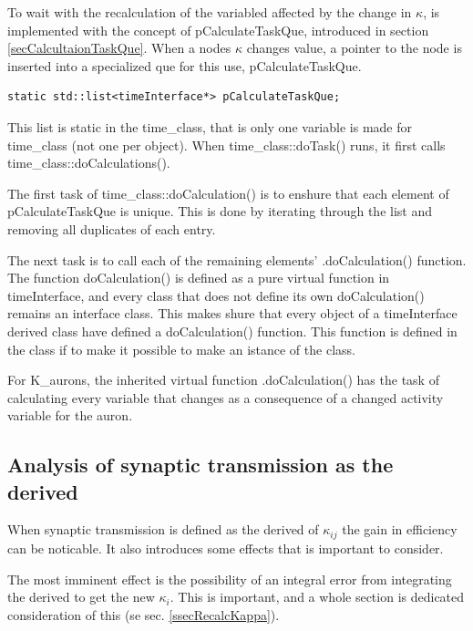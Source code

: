 			To wait with the recalculation of the variabled affected by the change in $\kappa$, is implemented with the concept of pCalculateTaskQue, introduced in section \ref{secCalcultaionTaskQue}.
			When a nodes $\kappa$ changes value, a pointer to the node is inserted into a specialized que for this use, pCalculateTaskQue.
\begin{lstlisting}
static std::list<timeInterface*> pCalculateTaskQue;
\end{lstlisting}
			This list is static in the time\_class, that is only one variable is made for time\_class (not one per object).
			When time\_class::doTask() runs, it first calls time\_class::doCalculations().

			The first task of time\_class::doCalculation() is to enshure that each element of pCalculateTaskQue is unique. 
			This is done by iterating through the list and removing all duplicates of each entry.
			
			The next task is to call each of the remaining elements' .doCalculation() function.
			The function doCalculation() is defined as a pure virtual function in timeInterface, and every class that does not define its own doCalculation() remains an interface class.
			This makes shure that every object of a timeInterface derived class have defined a doCalculation() function. This function is defined in the class if to make it possible to make an istance of the class.

			For K\_aurons, the inherited virtual function .doCalculation() has the task of calculating every variable that changes as a consequence of a changed activity variable for the auron.

			\subsection{Analysis of synaptic transmission as the derived}
			When synaptic transmission is defined as the derived of $\kappa_{ij}$ the gain in efficiency can be noticable. 
			It also introduces some effects that is important to consider. 

			The most imminent effect is the possibility of an integral error from integrating the derived to get the new $\kappa_i$. 
			This is important, and a whole section is dedicated consideration of this (se sec. \ref{ssecRecalcKappa}).



